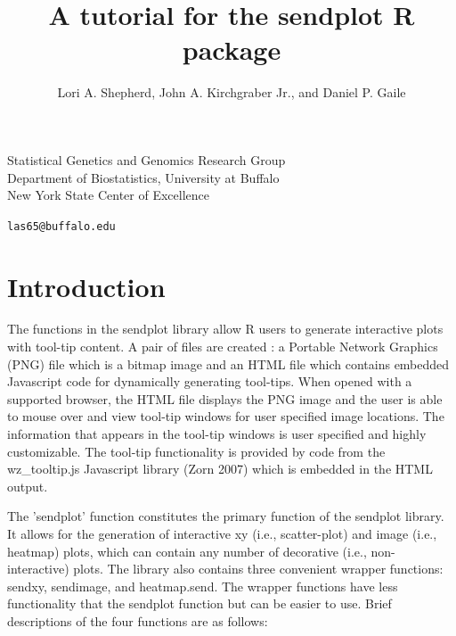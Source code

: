 \documentclass[]{article}
\title{A tutorial for the sendplot R package}
\author{Lori A. Shepherd, John A. Kirchgraber Jr., and Daniel P. Gaile}
\begin{document}
\maketitle

\begin{center}
Statistical Genetics and Genomics Research Group\\
Department of Biostatistics, University at Buffalo\\
New York State Center of Excellence
\end{center}

\begin{center}

{\tt las65@buffalo.edu}
\end{center}


\tableofcontents

\section{Introduction}


\indent The functions in the sendplot library allow R users to generate interactive plots with tool-tip content. A pair of files are created : a Portable Network Graphics (PNG) file which is a bitmap image and an HTML file which contains embedded Javascript code for dynamically generating tool-tips. When opened with a supported browser, the HTML file displays the PNG image and the user is able to mouse over and view tool-tip windows for user specified image locations. The information that appears in the tool-tip windows is user specified and highly customizable. The tool-tip functionality is provided by code from the  wz\_tooltip.js Javascript library (Zorn 2007) which is embedded in the HTML output.



\indent The 'sendplot' function constitutes the primary function of the sendplot library. It allows for the generation of interactive xy (i.e., scatter-plot) and image (i.e., heatmap) plots, which can contain any number of decorative (i.e., non-interactive) plots. The library also contains three convenient wrapper functions: sendxy, sendimage, and heatmap.send. The wrapper functions have less functionality that the sendplot function but can be easier to use. Brief descriptions of the four functions are as follows:
\end{document}

